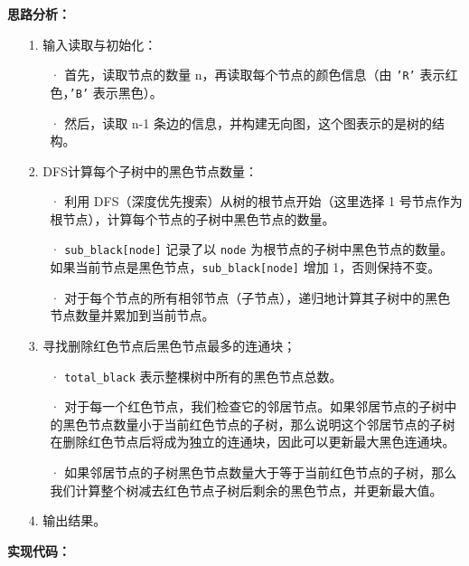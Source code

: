 \documentclass[a4paper]{ctexart}
\begin{document}
	\noindent\textbf{思路分析：}
	
	\begin{itemize}
		\item[1.] 输入读取与初始化：
		\begin{itemize}
			\item[·] 首先，读取节点的数量 n，再读取每个节点的颜色信息（由 \texttt{'R'} 表示红色，\texttt{'B'} 表示黑色）。
			\item[·] 然后，读取 n-1 条边的信息，并构建无向图，这个图表示的是树的结构。
		\end{itemize}
		
		\item[2.] DFS计算每个子树中的黑色节点数量：
		\begin{itemize}
			\item[·] 利用 DFS（深度优先搜索）从树的根节点开始（这里选择 1 号节点作为根节点），计算每个节点的子树中黑色节点的数量。
			\item[·] \texttt{sub\_black[node]} 记录了以 \texttt{node} 为根节点的子树中黑色节点的数量。如果当前节点是黑色节点，\texttt{sub\_black[node]} 增加 1，否则保持不变。
			\item[·] 对于每个节点的所有相邻节点（子节点），递归地计算其子树中的黑色节点数量并累加到当前节点。
		\end{itemize}
		
		\item[3.] 寻找删除红色节点后黑色节点最多的连通块；
		\begin{itemize}
			\item[·] \texttt{total\_black} 表示整棵树中所有的黑色节点总数。
			\item[·] 对于每一个红色节点，我们检查它的邻居节点。如果邻居节点的子树中的黑色节点数量小于当前红色节点的子树，那么说明这个邻居节点的子树在删除红色节点后将成为独立的连通块，因此可以更新最大黑色连通块。
			\item[·] 如果邻居节点的子树黑色节点数量大于等于当前红色节点的子树，那么我们计算整个树减去红色节点子树后剩余的黑色节点，并更新最大值。
		\end{itemize}
		
		\item[4.] 输出结果。
	\end{itemize}
	
	\noindent\textbf{实现代码：}
	
\end{document}
